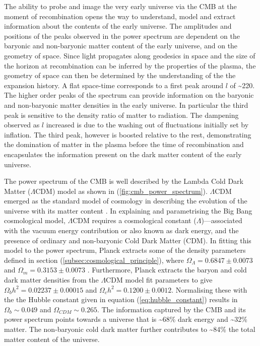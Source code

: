 The ability to probe and image the very early universe via the CMB at the moment of recombination opens the way to understand, model and extract information about the contents of the early universe. The amplitudes and positions of the peaks observed in the power spectrum are dependent on the baryonic and non-baryonic matter content of the early universe, and on the geometry of space. Since light propagates along geodesics in space and the size of the horizon at recombination can be inferred by the properties of the plasma, the geometry of space can then be determined by the understanding of the the expansion history. A flat space-time corresponds to a first peak around $l$ of \sim220. The higher order peaks of the spectrum can provide information on the baryonic and non-baryonic matter densities in the early universe. In particular the third peak is sensitive to the density ratio of matter to radiation. The dampening observed as $l$ increased is due to the washing out of fluctuations initially set by inflation. The third peak, however is boosted relative to the rest, demonstrating the domination of matter in the plasma before the time of recombination and encapsulates the information present on the dark matter content of the early universe.

The power spectrum of the CMB is well described by the Lambda Cold Dark Matter ($\Lambda$CDM) model as shown in (\ref{fig:cmb_power_spectrum}). $\Lambda$CDM emerged as the standard model of cosmology in describing the evolution of the universe with its matter content \cite{Modern_Cosmology}. In explaining and parametrising the Big Bang cosmological model, $\Lambda$CDM requires a cosmological constant ($\Lambda$)---associated with the vacuum energy contribution or also known as dark energy, and the presence of ordinary and non-baryonic Cold Dark Matter (CDM). In fitting this model to the power spectrum, Planck extracts some of the density parameters defined in section (\ref{subsec:cosmological_principle}), where $\Omega_{\Lambda} =  0.6847 \pm 0.0073$ and $\Omega_{m} =  0.3153 \pm 0.0073$ \cite{Plank_2018, Plank_2018_2}. Furthermore, Planck extracts the baryon and cold dark matter densities from the $\Lambda$CDM model fit parameters to give $\Omega_{b}h^2 = 0.02237 \pm 0.00015$ and $\Omega_{c}h^2 = 0.1200 \pm 0.0012$. Normalising these with the the Hubble constant given in equation (\ref{eq:hubble_constant}) results in $\Omega_{b} \sim 0.049$ and $\Omega_{CDM} \sim 0.265$. The information captured by the CMB and its power spectrum points towards a universe that is \sim 68\% dark energy and \sim 32\% matter. The non-baryonic cold dark matter further contributes to \sim 84\% the total matter content of the universe.


